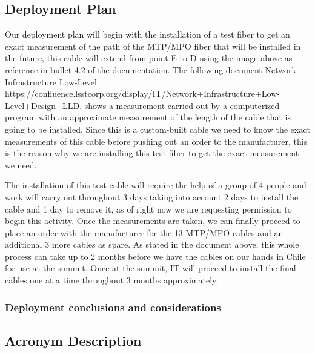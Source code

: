 \subsection{Deployment Plan}

Our deployment plan will begin with the installation of a test fiber to get an exact measurement of the path of the MTP/MPO fiber that will be installed in the future, this cable will extend from point E to D using the image above as reference in bullet 4.2 of the documentation. The following document Network Infrastructure Low-Level https://confluence.lsstcorp.org/display/IT/Network+Infrastructure+Low-Level+Design+LLD. shows a measurement carried out by a computerized program with an approximate measurement of the length of the cable that is going to be installed. Since this is a custom-built cable we need to know the exact measurements of this cable before pushing out an order to the manufacturer, this is the reason why we are installing this test fiber to get the exact measurement we need. 


The installation of this test cable will require the help of a group of 4 people and work will carry out throughout 3 days taking into account 2 days to install the cable and 1 day to remove it, as of right now we are requesting permission to begin this activity. Once the measurements are taken, we can finally proceed to place an order with the manufacturer for the 13 MTP/MPO cables and an additional 3 more cables as spare. As stated in the document above, this whole process can take up to 2 months before we have the cables on our hands in Chile for use at the summit. Once at the summit, IT will proceed to install the final cables one at a time throughout 3 months approximately.

\subsubsection{Deployment conclusions and considerations}


\subsection{Acronym Description}











